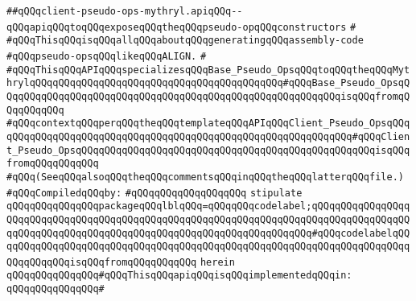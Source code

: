 \label{src/lib/compiler/back/low/main/nextcode/client-pseudo-ops-mythryl.api}
\verb|##qQQqclient-pseudo-ops-mythryl.apiqQQq--qQQqapiqQQqtoqQQqexposeqQQqtheqQQqpseudo-opqQQqconstructors|\newline
\verb|#|\newline
\verb|#qQQqThisqQQqisqQQqallqQQqaboutqQQqgeneratingqQQqassembly-code|\newline
\verb|#qQQqpseudo-opsqQQqlikeqQQqALIGN.|\newline
\verb|#|\newline
\verb|#qQQqThisqQQqAPIqQQqspecializesqQQqBase_Pseudo_OpsqQQqtoqQQqtheqQQqMythrylqQQqqQQqqQQqqQQqqQQqqQQqqQQqqQQqqQQqqQQqqQQq#qQQqBase_Pseudo_OpsqQQqqQQqqQQqqQQqqQQqqQQqqQQqqQQqqQQqqQQqqQQqqQQqqQQqqQQqqQQqisqQQqfromqQQqqQQqqQQq|\newline
\verb|#qQQqcontextqQQqperqQQqtheqQQqtemplateqQQqAPIqQQqClient_Pseudo_OpsqQQqqQQqqQQqqQQqqQQqqQQqqQQqqQQqqQQqqQQqqQQqqQQqqQQqqQQqqQQqqQQq#qQQqClient_Pseudo_OpsqQQqqQQqqQQqqQQqqQQqqQQqqQQqqQQqqQQqqQQqqQQqqQQqqQQqisqQQqfromqQQqqQQqqQQq|\newline
\verb|#qQQq(SeeqQQqalsoqQQqtheqQQqcommentsqQQqinqQQqtheqQQqlatterqQQqfile.)|\newline
\newline
\verb|#qQQqCompiledqQQqby:|\newline
\verb|#qQQqqQQqqQQqqQQqqQQq|\newline
\newline
\verb|stipulate|\newline
\verb|qQQqqQQqqQQqqQQqpackageqQQqlblqQQq=qQQqqQQqcodelabel;qQQqqQQqqQQqqQQqqQQqqQQqqQQqqQQqqQQqqQQqqQQqqQQqqQQqqQQqqQQqqQQqqQQqqQQqqQQqqQQqqQQqqQQqqQQqqQQqqQQqqQQqqQQqqQQqqQQqqQQqqQQqqQQqqQQqqQQqqQQq#qQQqcodelabelqQQqqQQqqQQqqQQqqQQqqQQqqQQqqQQqqQQqqQQqqQQqqQQqqQQqqQQqqQQqqQQqqQQqqQQqqQQqqQQqqQQqisqQQqfromqQQqqQQqqQQq|\newline
\verb|herein|\newline
\newline
\verb|qQQqqQQqqQQqqQQq#qQQqThisqQQqapiqQQqisqQQqimplementedqQQqin:|\newline
\verb|qQQqqQQqqQQqqQQq#|\newline
